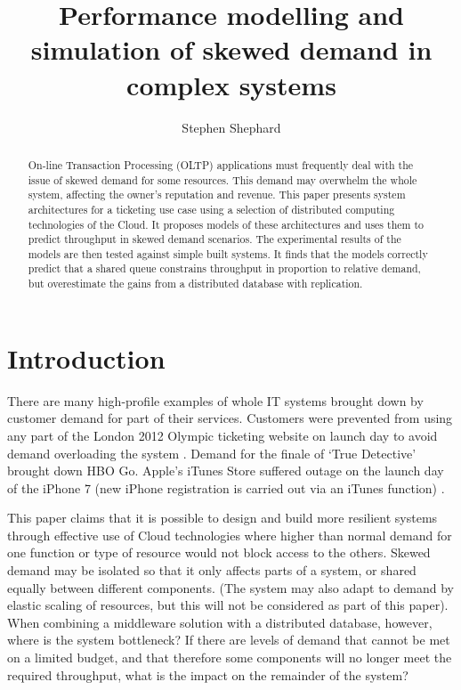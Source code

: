 \documentclass[runningheads]{llncs}
\begin{document}
\title{Performance modelling and simulation of skewed demand in complex systems}

\author{Stephen Shephard}


\maketitle

%
%
\begin{abstract}
On-line Transaction Processing (OLTP) applications must frequently deal with the issue of skewed demand for some resources.  This demand may overwhelm the whole system, affecting the owner's reputation and revenue.  This paper presents system architectures for a ticketing use case using a selection of distributed computing technologies of the Cloud.  It proposes models of these architectures and uses them to predict throughput in skewed demand scenarios.  The experimental results of the models are then tested against simple built systems.  It finds that the models correctly predict that a shared queue constrains throughput in proportion to relative demand, but overestimate the gains from a distributed database with replication.
\end{abstract}

%
%

\section{Introduction}\label{sec:introduction}

There are many high-profile examples of whole IT systems brought down by customer demand for part of their services.  Customers were prevented from using any part of the London 2012 Olympic ticketing website on launch day to avoid demand overloading the system \cite{RN1067}.  Demand for the finale of `True Detective' \cite{RN1066} brought down HBO Go.  Apple's iTunes Store suffered outage on the launch day of the iPhone 7 (new iPhone registration is carried out via an iTunes function) \cite{RN1068}.

This paper claims that it is possible to design and build more resilient systems through effective use of Cloud technologies where higher than normal demand for one function or type of resource would not block access to the others.  Skewed demand may be isolated so that it only affects parts of a system, or shared equally between different components. (The system may also adapt to demand by elastic scaling of resources, but this will not be considered as part of this paper).  When combining a middleware solution with a distributed database, however, where is the system bottleneck? If there are levels of demand that cannot be met on a limited budget, and that therefore some components will no longer meet the required throughput, what is the impact on the remainder of the system?
\end{document}
